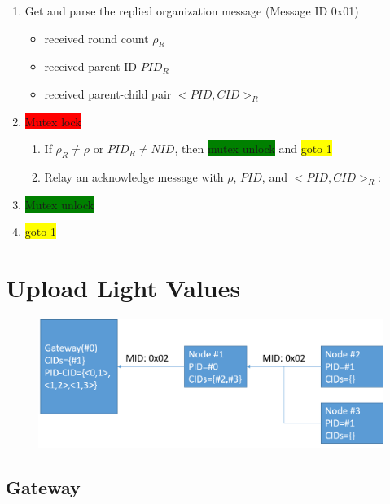 \documentclass[letterpaper,10pt]{article}
\begin{document}
\begin{enumerate}
	\item Get and parse the replied organization message (Message ID 0x01)
	\begin{itemize}
		\item received round count $\rho_R$
		\item received parent ID $PID_R$
		\item received parent-child pair $<PID,CID>_R$
	\end{itemize}
	\item \colorbox{red}{Mutex lock}
	\begin{enumerate}
		\item If $\rho_R \neq \rho$ or $PID_R \neq NID$, then \colorbox{green}{mutex unlock} and \colorbox{yellow}{goto 1}
		\item Relay an acknowledge message with $\rho$, $PID$, and  $<PID,CID>_R$:\\
	\end{enumerate}
	\item \colorbox{green}{Mutex unlock}
	\item \colorbox{yellow}{goto 1}	
\end{enumerate}


\newpage
\section{Upload Light Values}

\begin{figure}[!h]
	\centering
	\includegraphics[width=12cm]{./img/lightvalue.png}
\end{figure}

\subsection{Gateway}
\end{document}
